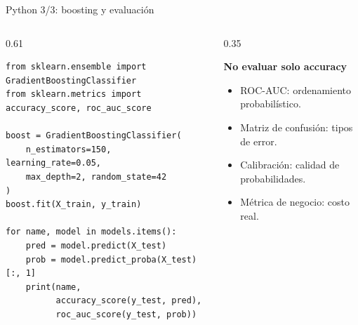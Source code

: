 \documentclass[aspectratio=169,11pt,table]{beamer}
\begin{document}
\begin{frame}[fragile]{Python 3/3: boosting y evaluación}
\begin{columns}[T,onlytextwidth]
\begin{column}{0.61\textwidth}
\begin{lstlisting}[style=ccdepython]
from sklearn.ensemble import GradientBoostingClassifier
from sklearn.metrics import accuracy_score, roc_auc_score

boost = GradientBoostingClassifier(
    n_estimators=150, learning_rate=0.05,
    max_depth=2, random_state=42
)
boost.fit(X_train, y_train)

for name, model in models.items():
    pred = model.predict(X_test)
    prob = model.predict_proba(X_test)[:, 1]
    print(name,
          accuracy_score(y_test, pred),
          roc_auc_score(y_test, prob))
\end{lstlisting}
\end{column}
\begin{column}{0.35\textwidth}
\begin{keybox}
\textbf{No evaluar solo accuracy}
\begin{itemize}
  \item ROC-AUC: ordenamiento probabilístico.
  \item Matriz de confusión: tipos de error.
  \item Calibración: calidad de probabilidades.
  \item Métrica de negocio: costo real.
\end{itemize}
\end{keybox}
\end{column}
\end{columns}
\end{frame}
\end{document}
